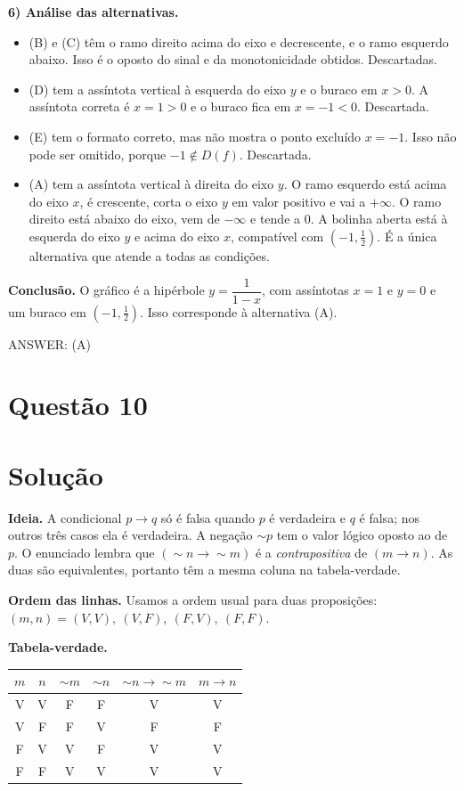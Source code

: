 \documentclass{article}%
\begin{document}
\textbf{6) Análise das alternativas.}
\begin{itemize}
\item (B) e (C) têm o ramo direito acima do eixo e decrescente, e o ramo esquerdo abaixo. Isso é o oposto do sinal e da monotonicidade obtidos. Descartadas.
\item (D) tem a assíntota vertical à esquerda do eixo $y$ e o buraco em $x>0$. A assíntota correta é $x=1>0$ e o buraco fica em $x=-1<0$. Descartada.
\item (E) tem o formato correto, mas não mostra o ponto excluído $x=-1$. Isso não pode ser omitido, porque $-1\notin D(f)$. Descartada.
\item (A) tem a assíntota vertical à direita do eixo $y$. O ramo esquerdo está acima do eixo $x$, é crescente, corta o eixo $y$ em valor positivo e vai a $+\infty$. O ramo direito está abaixo do eixo, vem de $-\infty$ e tende a $0$. A bolinha aberta está à esquerda do eixo $y$ e acima do eixo $x$, compatível com $\left(-1,\tfrac12\right)$. É a única alternativa que atende a todas as condições.
\end{itemize}

\textbf{Conclusão.} O gráfico é a hipérbole $y=\dfrac{1}{1-x}$, com assíntotas $x=1$ e $y=0$ e um buraco em $\left(-1,\tfrac12\right)$. Isso corresponde à alternativa (A).

ANSWER: (A)%
\newpage%
\section*{Questão 10}

\section*{Solução}

\textbf{Ideia.} A condicional $p\rightarrow q$ só é falsa quando $p$ é verdadeira e $q$ é falsa; nos outros três casos ela é verdadeira. A negação $\sim p$ tem o valor lógico oposto ao de $p$. O enunciado lembra que $(\sim n\rightarrow\sim m)$ é a \emph{contrapositiva} de $(m\rightarrow n)$. As duas são equivalentes, portanto têm a mesma coluna na tabela-verdade.

\textbf{Ordem das linhas.} Usamos a ordem usual para duas proposições: $(m,n)=(V,V),\ (V,F),\ (F,V),\ (F,F)$.

\textbf{Tabela-verdade.}
\begin{center}
\begin{tabular}{|c|c|c|c|c|c|}
\hline
$m$ & $n$ & $\sim m$ & $\sim n$ & $\sim n\rightarrow\sim m$ & $m\rightarrow n$\\
\hline
V & V & F & F & V & V\\
V & F & F & V & F & F\\
F & V & V & F & V & V\\
F & F & V & V & V & V\\
\hline
\end{tabular}
\end{center}
\end{document}
